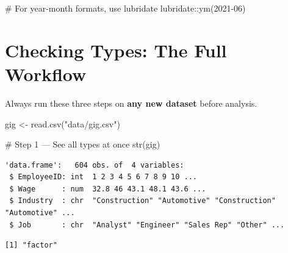 \documentclass[
  letterpaper,
  DIV=11,
  numbers=noendperiod]{scrreprt}
\newenvironment{Shaded}{\begin{snugshade}}{\end{snugshade}}
\newcommand{\CommentTok}[1]{\textcolor[rgb]{0.37,0.37,0.37}{#1}}
\newcommand{\DocumentationTok}[1]{\textcolor[rgb]{0.37,0.37,0.37}{\textit{#1}}}
\newcommand{\FunctionTok}[1]{\textcolor[rgb]{0.28,0.35,0.67}{#1}}
\newcommand{\NormalTok}[1]{\textcolor[rgb]{0.00,0.23,0.31}{#1}}
\newcommand{\OtherTok}[1]{\textcolor[rgb]{0.00,0.23,0.31}{#1}}
\newcommand{\SpecialCharTok}[1]{\textcolor[rgb]{0.37,0.37,0.37}{#1}}
\newcommand{\StringTok}[1]{\textcolor[rgb]{0.13,0.47,0.30}{#1}}
\begin{document}
\begin{Shaded}
\begin{Highlighting}[]
\CommentTok{\# For year{-}month formats, use lubridate lubridate::ym(\textquotesingle{}2021{-}06\textquotesingle{})}
\end{Highlighting}
\end{Shaded}

\section{Checking Types: The Full
Workflow}\label{checking-types-the-full-workflow}

Always run these three steps on \textbf{any new dataset} before
analysis.

\begin{Shaded}
\begin{Highlighting}[]
\NormalTok{gig }\OtherTok{\textless{}{-}} \FunctionTok{read.csv}\NormalTok{(}\StringTok{"data/gig.csv"}\NormalTok{)}

\CommentTok{\# Step 1 — See all types at once}
\FunctionTok{str}\NormalTok{(gig)}
\end{Highlighting}
\end{Shaded}

\begin{verbatim}
'data.frame':   604 obs. of  4 variables:
 $ EmployeeID: int  1 2 3 4 5 6 7 8 9 10 ...
 $ Wage      : num  32.8 46 43.1 48.1 43.6 ...
 $ Industry  : chr  "Construction" "Automotive" "Construction" "Automotive" ...
 $ Job       : chr  "Analyst" "Engineer" "Sales Rep" "Other" ...
\end{verbatim}

\begin{Shaded}
\end{Shaded}

\begin{verbatim}
[1] "factor"
\end{verbatim}
\end{document}
